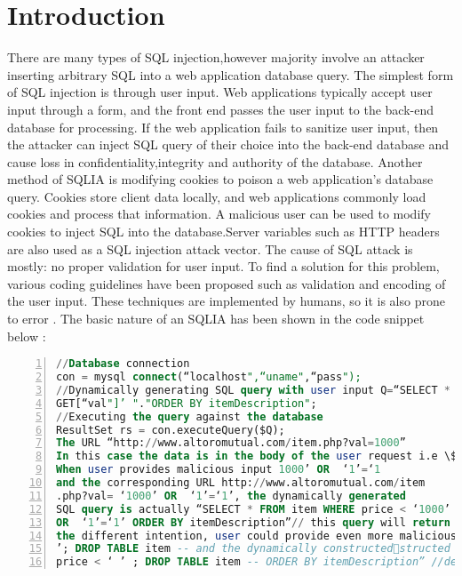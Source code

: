 \documentclass[12pt]{article}
\begin{document}
\section{Introduction}
There are many types of SQL injection,however majority involve an attacker inserting arbitrary SQL into a web application database query. The simplest form of SQL injection is through user input. Web applications typically accept user input through a form, and the front end passes the user input to the back-end database for processing. If the web application fails to sanitize user input, then the attacker can inject SQL query of their choice into the back-end database and cause loss in confidentiality,integrity and authority \cite{kindy2011survey}
 of the database. Another method of SQLIA is modifying cookies to poison a web application's database query. Cookies store client data locally, and web applications commonly load cookies and process that information. A malicious user can be used to modify cookies to inject SQL into the database.Server variables such as HTTP headers are also used as a SQL injection attack vector. 
The cause of SQL attack is mostly: no proper validation for user input. To find a solution for this problem, various coding guidelines have been proposed such as validation and encoding of the user input. These techniques are implemented by humans, so it 
is also prone to error \cite{clarke2009sql}. The basic nature of an SQLIA has been shown in the code snippet below \cite{jana2020code}:
\begin{lstlisting}[caption=SQLIA classic bypass,language=SQL,showspaces=false,
           showstringspaces=false,
           basicstyle=\ttfamily\small,
           numbers=left,
           numberstyle=\tiny,
           label=sql code,
           commentstyle=\color{green!60},
           breaklines=true,backgroundcolor=\color{lightgray}]
//Database connection
con = mysql connect(“localhost",“uname",“pass");
//Dynamically generating SQL query with user input Q=“SELECT * FROM item WHERE cost < ‘$
GET[“val"]’ "."ORDER BY itemDescription";
//Executing the query against the database
ResultSet rs = con.executeQuery($Q);
The URL “http://www.altoromutual.com/item.php?val=1000”
In this case the data is in the body of the user request i.e \$dollar
When user provides malicious input 1000’ OR  ‘1’=‘1
and the corresponding URL http://www.altoromutual.com/item
.php?val= ‘1000’ OR  ‘1’=‘1’, the dynamically generated
SQL query is actually “SELECT * FROM item WHERE price < ‘1000’
OR  ‘1’=‘1’ ORDER BY itemDescription”// this query will return all details of the given database since 1=1 is a universal truth irrespective of the other condition. This is called tautology-based SQLIA.Depending on
the different intention, user could provide even more malicious input like:
’; DROP TABLE item -- and the dynamically constructedstructed SQL query “SELECT * FROM item WHERE
price < ‘ ’ ; DROP TABLE item -- ORDER BY itemDescription” //deletes the ’item’ table from the database since the input string has been closed at the beginning itself and the text after it is ignored by '--'.
\end{lstlisting}
\end{document}
